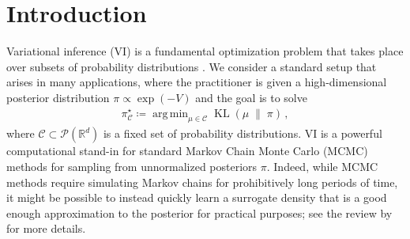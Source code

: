 \documentclass[twoside]{article}
\newcommand{\cC}{\mathcal{C}}
\newcommand{\cP}{\mathcal{P}}
\newcommand{\1}{\mathds{1}}
\newcommand{\kl}[2]{\KL(#1 \!\;\|\; \!#2)}
\newcommand{\R}{\mathbb{R}}
\newcommand*{\defeq}{\coloneqq}
\DeclareMathOperator*{\argmin}{arg\,min}
\DeclareMathOperator*{\KL}{KL}
\theoremstyle{plain}
\theoremstyle{definition}
\theoremstyle{remark}
\begin{document}

\begin{abstract}
In variational inference (VI), the practitioner approximates a high-dimensional distribution $\pi$ with a simple surrogate one, often a (product) Gaussian distribution. However, in many cases of practical interest, Gaussian distributions might not capture the correct radial profile of $\pi$, resulting in poor coverage. In this work, we approach the VI problem from the perspective of optimizing over these radial profiles. Our algorithm \texttt{radVI} is a cheap, effective add-on to many existing VI schemes, such as Gaussian (mean-field) VI and Laplace approximation. We provide theoretical convergence guarantees for our algorithm, owing to recent developments in optimization over the Wasserstein space---the space of probability distributions endowed with the Wasserstein distance---and new regularity properties of radial transport maps in the style of \citet{Caffarelli2000}. 
\end{abstract}

\section{Introduction}
Variational inference (VI) is a fundamental optimization problem that takes place over subsets of probability distributions \citep{Wainwright2008, Blei2017}. We consider a standard setup that arises in many applications, where the practitioner is given a high-dimensional posterior distribution $\pi \propto \exp(-V)$ and the goal is to solve
\begin{align*}
    \pi^\star_{\cC} \defeq \argmin_{\mu \in \cC} \kl{\mu}{\pi}\,,
\end{align*}
where $\cC \subset \cP(\R^d)$ is a fixed set of probability distributions. VI is a powerful computational stand-in for standard Markov Chain Monte Carlo (MCMC) methods for sampling from unnormalized posteriors $\pi$. Indeed, while MCMC methods require simulating Markov chains for prohibitively long periods of time, it might be possible to instead quickly learn a surrogate density that is a good enough approximation to the posterior for practical purposes; see the review by \citet{Blei2017} for more details.
\end{document}
